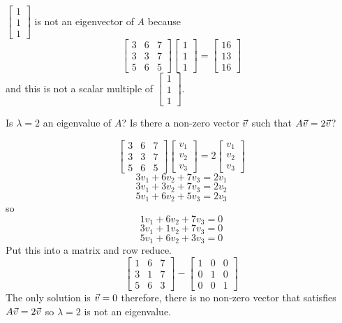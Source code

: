 \documentclass[english, 12pt]{article}
\begin{document}
\begin{exmp}
$\begin{bmatrix} 1 \\ 1 \\ 1 \end{bmatrix}$ is not an eigenvector of $A$ because
\[\begin{bmatrix} 3 & 6 & 7 \\ 3 & 3 & 7 \\ 5 & 6 & 5 \end{bmatrix} \begin{bmatrix} 1 \\ 1 \\ 1 \end{bmatrix} = \begin{bmatrix} 16 \\ 13 \\ 16 \end{bmatrix}\]
and this is not a scalar multiple of $\begin{bmatrix} 1 \\ 1 \\ 1 \end{bmatrix}$.
\end{exmp}

\begin{exmp}
Is $\lambda=2$ an eigenvalue of $A$? Is there a non-zero vector $\vec{v}$ such that $A\vec{v} = 2 \vec{v}$?

\begin{sol}
\[\begin{bmatrix} 3 & 6 & 7 \\ 3 & 3 & 7 \\ 5 & 6 & 5 \end{bmatrix} \begin{bmatrix} v_{1} \\ v_{2} \\ v_{3} \end{bmatrix} = 2 \begin{bmatrix} v_{1} \\ v_{2} \\ v_{3} \end{bmatrix}\]
\[3v_{1} + 6 v_{2} + 7 v_{3} = 2v_{1}\]
\[3v_{1} + 3v_{2} + 7 v_{3} = 2v_{2}\]
\[5v_{1} + 6v_{2} + 5 v_{3} = 2v_{3}\]
so
\[1v_{1} + 6 v_{2} + 7 v_{3} = 0\]
\[3v_{1} + 1v_{2} + 7 v_{3} = 0\]
\[5v_{1} + 6v_{2} + 3 v_{3} = 0\]
Put this into a matrix and row reduce.
\[\begin{bmatrix} 1 & 6 & 7 \\ 3 & 1 & 7 \\ 5 & 6 & 3\end{bmatrix} - \begin{bmatrix} 1 & 0 & 0 \\ 0 & 1 & 0 \\ 0 & 0 & 1\end{bmatrix}\]
The only solution is $\vec{v} = 0$ therefore, there is no non-zero vector that satisfies $A\vec{v} = 2 \vec{v}$ so $\lambda = 2$ is not an eigenvalue.
\end{sol}
\end{exmp}
\end{document}

